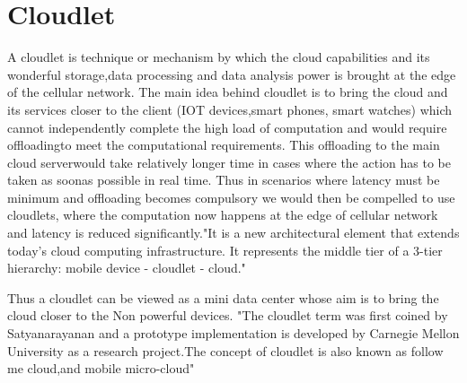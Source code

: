 \section{Cloudlet}


A cloudlet is technique or mechanism by which the cloud capabilities
and its wonderful storage,data processing and data analysis power is 
brought at the edge of the cellular network.
The main idea behind cloudlet is to bring the cloud and its services closer
to the client (IOT devices,smart phones, smart watches) which cannot 
independently complete the high load of computation and would require 
offloadingto meet the computational requirements. This offloading to the 
main cloud serverwould take relatively longer time in cases where the action 
has to be taken as soonas possible in real time. Thus in scenarios where 
latency must be minimum and offloading becomes compulsory we would then 
be compelled to use cloudlets, where the computation now happens at the 
edge of cellular network and latency is reduced significantly."It is a 
new architectural element that extends today’s cloud computing infrastructure. 
It represents the middle tier of a 3-tier hierarchy: mobile device - 
cloudlet - cloud." \cite{wikiCloudlet}

Thus a cloudlet can be viewed as a mini data center whose aim is to 
bring the cloud closer to the Non powerful devices. "The cloudlet term was first coined 
by Satyanarayanan and a prototype implementation is developed by Carnegie 
Mellon University as a research project.The concept of cloudlet is also 
known as follow me cloud,and mobile micro-cloud" \cite{wikiCloudlet}
